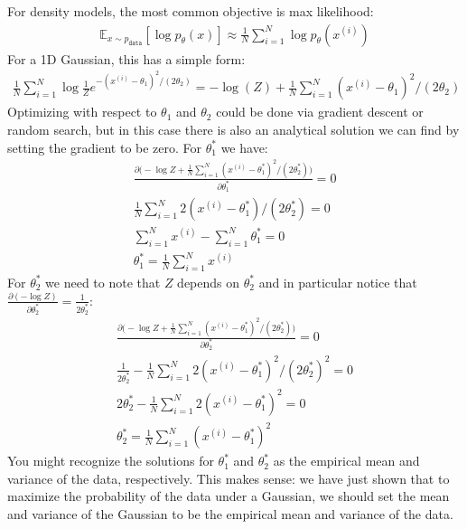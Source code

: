 For density models, the most common objective is max likelihood:
\begin{align}
     \mathbb{E}_{x \sim p_{\texttt{data}}}[\log p_{\theta}(x)] \approx \frac{1}{N} \sum_{i=1}^N \log p_{\theta}(x^{(i)})
\end{align}
For a 1D Gaussian, this has a simple form:
\begin{align}
     \frac{1}{N} \sum_{i=1}^N \log \frac{1}{Z}e^{-(x^{(i)}-\theta_1)^2/(2\theta_2)} = -\log(Z) + \frac{1}{N}\sum_{i=1}^N (x^{(i)}-\theta_1)^2/(2\theta_2)
\end{align}
Optimizing with respect to $\theta_1$ and $\theta_2$ could be done via gradient descent or random search, but in this case there is also an analytical solution we can find by setting the gradient to be zero. For $\theta_1^*$ we have:
\begin{align}
    \frac{\partial \big(-\log Z + \frac{1}{N}\sum_{i=1}^N (x^{(i)}-\theta_1^*)^2/(2\theta_2^*)\big)}{\partial \theta_1^*} = 0\\
    \frac{1}{N}\sum_{i=1}^N 2(x^{(i)}-\theta_1^*)/(2\theta_2^*) = 0\\
    \sum_{i=1}^N x^{(i)} - \sum_{i=1}^N \theta_1^* = 0\\
    \theta_1^* = \frac{1}{N}\sum_{i=1}^N x^{(i)}
\end{align}
For $\theta_2^*$ we need to note that $Z$ depends on  $\theta_2^*$ and in particular notice that $\frac{\partial (-\log Z)}{\partial \theta_2^*} = \frac{1}{2\theta_2^*}$:
\begin{align}
    \frac{\partial \big(-\log Z + \frac{1}{N}\sum_{i=1}^N (x^{(i)}-\theta_1^*)^2/(2\theta_2^*)\big)}{\partial \theta_2^*} = 0\\
    \frac{1}{2\theta_2^*} - \frac{1}{N}\sum_{i=1}^N 2(x^{(i)}-\theta_1^*)^2/(2\theta_2^*)^2 = 0\\
    2\theta_2^* - \frac{1}{N}\sum_{i=1}^N 2(x^{(i)}-\theta_1^*)^2 = 0\\
    \theta_2^* = \frac{1}{N}\sum_{i=1}^N (x^{(i)}-\theta_1^*)^2
\end{align}
You might recognize the solutions for $\theta_1^*$ and $\theta_2^*$ as the empirical mean and variance of the data, respectively. This makes sense: we have just shown that to maximize the probability of the data under a Gaussian, we should set the mean and variance of the Gaussian to be the empirical mean and variance of the data.

